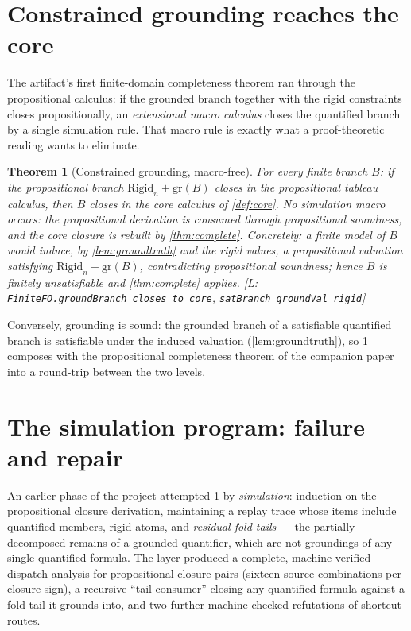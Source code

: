 \documentclass[11pt,a4paper]{article}
\newtheorem{theorem}{Theorem}[section]
\theoremstyle{definition}
\newcommand{\lean}[1]{\texttt{#1}}
\newcommand{\grd}{\mathrm{gr}}
\begin{document}
\section{Constrained grounding reaches the core}\label{sec:grounding}

The artifact's first finite-domain completeness theorem ran through the
propositional calculus: if the grounded branch together with the rigid
constraints closes propositionally, an \emph{extensional macro calculus}
closes the quantified branch by a single simulation rule. That macro rule
is exactly what a proof-theoretic reading wants to eliminate.

\begin{theorem}[Constrained grounding, macro-free]\label{thm:grounding}
For every finite branch $B$: if the propositional branch
$\mathrm{Rigid}_n + \grd(B)$ closes in the propositional tableau
calculus, then $B$ closes in the core calculus of \cref{def:core}. No
simulation macro occurs: the propositional derivation is consumed through
propositional soundness, and the core closure is rebuilt by
\cref{thm:complete}. Concretely: a finite model of $B$ would induce, by
\cref{lem:groundtruth} and the rigid values, a propositional valuation
satisfying $\mathrm{Rigid}_n + \grd(B)$, contradicting propositional
soundness; hence $B$ is finitely unsatisfiable and
\cref{thm:complete} applies.
[L:\,\lean{FiniteFO.groundBranch\_closes\_to\_core},
\lean{satBranch\_groundVal\_rigid}]
\end{theorem}

Conversely, grounding is sound: the grounded branch of a satisfiable
quantified branch is satisfiable under the induced valuation
(\cref{lem:groundtruth}), so \cref{thm:grounding} composes with the
propositional completeness theorem of the companion paper into a
round-trip between the two levels.

\section{The simulation program: failure and repair}\label{sec:simulation}

An earlier phase of the project attempted \cref{thm:grounding} by
\emph{simulation}: induction on the propositional closure derivation,
maintaining a replay trace whose items include quantified members, rigid
atoms, and \emph{residual fold tails} — the partially decomposed remains
of a grounded quantifier, which are not groundings of any single
quantified formula. The layer produced a complete, machine-verified
dispatch analysis for propositional closure pairs (sixteen source
combinations per closure sign), a recursive ``tail consumer'' closing any
quantified formula against a fold tail it grounds into, and two further
machine-checked refutations of shortcut routes.
\end{document}
